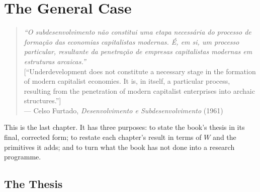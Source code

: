 \documentclass[../structural_economics_book.tex]{subfiles}
\begin{document}
\ifSubfilesClassLoaded{\setcounter{chapter}{27}}{}
\chapter{The General Case}\label{ch:28}
\begin{quote}
\textit{``O subdesenvolvimento n\~{a}o constitui uma etapa necess\'{a}ria do processo de forma\c{c}\~{a}o das economias capitalistas modernas. \'{E}, em si, um processo particular, resultante da penetra\c{c}\~{a}o de empresas capitalistas modernas em estruturas arcaicas.''}\\[0.3em]
\textnormal{[``Underdevelopment does not constitute a necessary stage in the formation of modern capitalist economies. It is, in itself, a particular process, resulting from the penetration of modern capitalist enterprises into archaic structures.'']}\\
\hfill --- Celso Furtado, \textit{Desenvolvimento e Subdesenvolvimento} (1961)
\end{quote}
\nocite{furtado1961desenvolvimento}

\vspace{1em}

This is the last chapter. It has three purposes: to state the book's thesis in its final, corrected form; to restate each chapter's result in terms of $W$ and the primitives it adds; and to turn what the book has not done into a research programme.


\section{The Thesis}
\label{ch28:sec:thesis}
\end{document}

